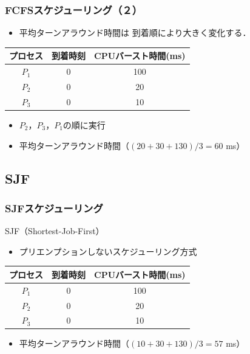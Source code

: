 \documentclass[unicode,handout]{beamer}                   %
\begin{document}
\begin{frame}
  \frametitle{FCFSスケジューリング（２）}
  \begin{itemize}
    \item 平均ターンアラウンド時間は 到着順により大きく変化する．
  \end{itemize}
  \vfill
  \small\begin{tabular}{c c c}
    プロセス & 到着時刻 & CPUバースト時間(ms) \\
    \hline
    $P_1$    & 0 & 100 \\
    $P_2$    & 0 & 20 \\
    $P_3$    & 0 & 10 \\
  \end{tabular}
  \vfill
  \vfill
  \begin{itemize}
    \item $P_2$，$P_3$，$P_1$の順に実行
    \item 平均ターンアラウンド時間（$(20+30+130) / 3 = 60$ ms）
  \end{itemize}
  \vfill
\end{frame}

\subsection{SJF}
\begin{frame}
  \frametitle{SJFスケジューリング}
  SJF（Shortest-Job-First）
  \vfill
  \begin{itemize}
    \item プリエンプションしないスケジューリング方式
  \end{itemize}
  \vfill
  \small\begin{tabular}{c c c}
    プロセス & 到着時刻 & CPUバースト時間(ms) \\
    \hline
    $P_1$    & 0 & 100 \\
    $P_2$    & 0 & 20 \\
    $P_3$    & 0 & 10 \\
  \end{tabular}
  \vfill
  \vfill
  \begin{itemize}
    \item 平均ターンアラウンド時間（$(10+30+130) / 3 = 57$ ms）
  \end{itemize}
  \vfill
\end{frame}
\end{document}
